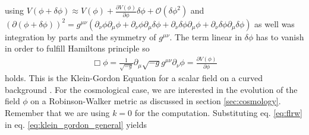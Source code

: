 \documentclass[twoside,a4paper, 12pt]{article}
\numberwithin{equation}{section}
\begin{document}
using
$
    V(\phi + \delta \phi) \approx V(\phi) + \frac{\partial V(\phi)}{\partial \phi} \delta \phi + \mathcal{O}(\delta \phi^2)
$
and
$(\partial (\phi + \delta \phi))^2  = g^{\mu \nu} (\partial_\nu \phi \partial_\mu \phi + \partial_\nu \phi \partial_\mu \delta \phi + \partial_\nu \delta \phi \partial_\mu \phi + \partial_\nu \delta \phi \partial_\mu \delta \phi) $
as well was integration by parts %
and the symmetry of $g^{\mu \nu}$. %
The term linear in $\delta \phi$ has to vanish in order to fulfill Hamiltons principle so
\begin{align}
    \label{eq:klein_gordon_general}
    \Box \phi = \frac{1}{\sqrt{-g}} \partial_\mu \sqrt{-g} g^{\mu \nu} \partial_\nu \phi = \frac{\partial V(\phi)}{\partial \phi}
\end{align}
holds.
This is the Klein-Gordon Equation for a scalar field on a curved background \cite[Chap. 4.1, Page 26]{MarshAxionCosmo}.
For the cosmological case, we are interested in the evolution of the field $\phi$ on a Robinson-Walker metric as discussed in section \ref{sec:cosmology}.
Remember that we are using $k = 0$ for the computation.
Substituting eq.
\eqref{eq:flrw} in eq. \eqref{eq:klein_gordon_general} yields
\end{document}
